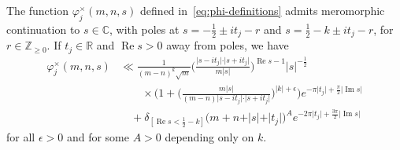 \documentclass[10pt,a4paper]{amsart}
\renewcommand{\Im}{\operatorname{Im}}
\renewcommand{\Re}{\operatorname{Re}}
\begin{document}
\begin{lemma} \label{lem:phi-cross-behavior}
The function $\varphi_j^\times(m,n,s)$ defined in~\eqref{eq:phi-definitions} admits meromorphic continuation to $s \in \mathbb{C}$, with poles at $s = -\frac{1}{2} \pm it_j -r$ and $s = \frac{1}{2} - k \pm it_j - r$, for $r \in \mathbb{Z}_{\geq 0}$. If $t_j \in \mathbb{R}$ and $\Re s > 0$ away from poles, we have
\begin{align} \label{eq:phi-cross-upper-bound}
	\varphi_j^\times(m,n,s)
	&\ll  \frac{1}{(m-n)^k\sqrt{m}}
	\Big( \frac{\vert s - it_j \vert \cdot \vert s + it_j\vert}{m \vert s \vert}\Big)^{\Re s -1}
	\vert s \vert^{-\frac{1}{2}} \\
	& \qquad
	\times \! \Big( 
		1 + \Big( 
					\frac{m\vert s \vert}{(m-n)\vert s - it_j \vert \cdot \vert s + it_j\vert}
					\Big)^{\vert k \vert +\epsilon} \Big)
	e^{-\pi \vert t_j \vert + \frac{\pi}{2} \vert \Im s \vert}  \\
	& \quad 
	+ \delta_{[\Re s < \frac{1}{2} - k]} \big(m+n+ \vert s \vert + \vert t_j \vert\big)^A
	e^{-2\pi \vert t_j \vert + \frac{3\pi}{2} \vert \Im s \vert}
\end{align}
for all $\epsilon > 0$ and for some $A>0$ depending only on $k$.
\end{lemma}
\end{document}
